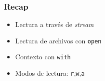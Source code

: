 \documentclass[14pt,aspectratio=169,xcolor=dvipsnames]{beamer}
\newcommand{\code}[1]{{\color{purple}\tt#1}}
\begin{document}
\begin{frame}


\end{frame}
\begin{frame}\frametitle{Recap}
    \begin{itemize}
        \item Lectura a través de \emph{stream}
        \item Lectura de archivos con \code{open}
        \item Contexto con \code{with}
        \item Modos de lectura: \code{r},\code{w},\code{a}
    \end{itemize}
\end{frame}
\begin{frame}
    \maketitle
\end{frame}
\end{document}
